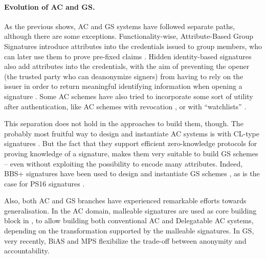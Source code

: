 \paragraph{Evolution of AC and GS.} %
As the previous shows, AC and GS systems have followed separate paths, although
there are some exceptions. Functionality-wise, Attribute-Based Group Signatures
introduce attributes into the credentials issued to group members, who can later
use them to prove pre-fixed claims \cite{emo09,aa14}. Hidden identity-based
signatures also add attributes into the credentials, with the aim of preventing
the opener (the trusted party who can deanonymize signers) from having to rely
on the issuer in order to return meaningful identifying information when opening
a signature \cite{ks07}. Some AC schemes have also tried to incorporate some
sort of utility after authentication, like AC schemes with revocation
\cite{cks10}, or with ``watchlists'' \needcite.

This separation does not hold in the approaches to build them, though. The
probably most fruitful way to design and instantiate AC systems
is with CL-type signatures \cite{cl02}. But the fact that they support efficient
zero-knowledge protocols for proving knowledge of a signature, makes them very
suitable to build GS schemes -- even without exploiting the possibility to
encode many attributes. Indeed, BBS+ signatures \cite{bbs04,cdl16b} have been
used to design and instantiate GS schemes \cite{gl19,dl21}, as is the case for
PS16 signatures \cite{ps16,cdl+20}.

Also, both AC and GS branches have experienced remarkable efforts towards
generalisation. In the AC domain, malleable signatures are used as core building
block in \cite{cklm14}, to allow building both conventional AC and Delegatable
AC systems, depending on the transformation supported by the malleable
signatures. In GS, very recently, BiAS \cite{lnpy21} and MPS \cite{ngsy22}
flexibilize the trade-off between anonymity and accountability.


